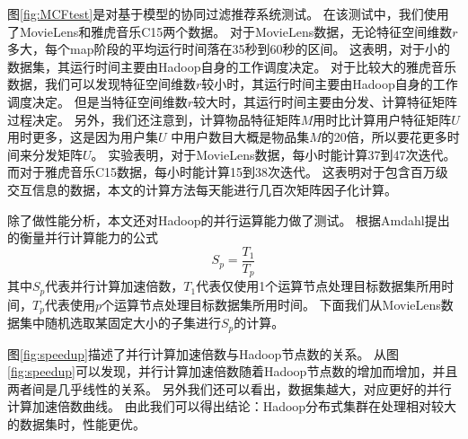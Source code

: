 图\ref{fig:MCFtest}是对基于模型的协同过滤推荐系统测试。
在该测试中，我们使用了MovieLens和雅虎音乐C15两个数据。
对于MovieLens数据，无论特征空间维数$r$多大，每个map阶段的平均运行时间落在35秒到60秒的区间。
这表明，对于小的数据集，其运行时间主要由Hadoop自身的工作调度决定。
对于比较大的雅虎音乐数据，我们可以发现特征空间维数$r$较小时，其运行时间主要由Hadoop自身的工作调度决定。
但是当特征空间维数$r$较大时，其运行时间主要由分发、计算特征矩阵过程决定。
另外，我们还注意到，计算物品特征矩阵$M$用时比计算用户特征矩阵$U$用时更多，这是因为用户集$U$
中用户数目大概是物品集$M$的20倍，所以要花更多时间来分发矩阵$U$。
实验表明，对于MovieLens数据，每小时能计算37到47次迭代。而对于雅虎音乐C15数据，每小时能计算15到38次迭代。
这表明对于包含百万级交互信息的数据，本文的计算方法每天能进行几百次矩阵因子化计算。

除了做性能分析，本文还对Hadoop的并行运算能力做了测试。
根据Amdahl\parencite{Amdahl1967Validity}提出的衡量并行计算能力的公式
\begin{equation}
S_p = \frac{T_1}{T_p}
\end{equation}
其中$S_p$代表并行计算加速倍数，$T_1$代表仅使用1个运算节点处理目标数据集所用时间，$T_p$代表使用$p$个运算节点处理目标数据集所用时间。
下面我们从MovieLens数据集中随机选取某固定大小的子集进行$S_p$的计算。
\begin{center}
\pgfplotsset{compat=1.13}
\label{fig:speedup}
\end{center}

图\ref{fig:speedup}描述了并行计算加速倍数与Hadoop节点数的关系。
从图\ref{fig:speedup}可以发现，并行计算加速倍数随着Hadoop节点数的增加而增加，并且两者间是几乎线性的关系。
另外我们还可以看出，数据集越大，对应更好的并行计算加速倍数曲线。
由此我们可以得出结论：Hadoop分布式集群在处理相对较大的数据集时，性能更优。
